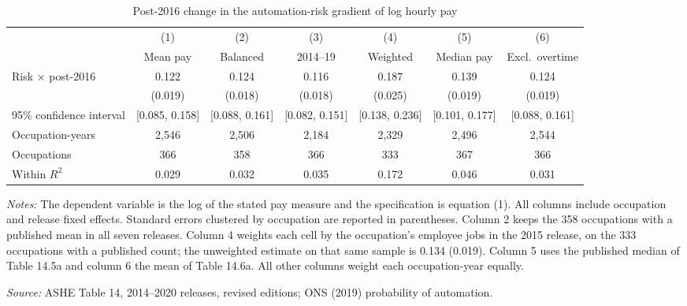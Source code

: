 \begin{table}[!ht]\centering
\caption{Post-2016 change in the automation-risk gradient of log hourly pay}\label{tab:pay}
\begin{threeparttable}\scriptsize\setlength{\tabcolsep}{2.5pt}
\begin{tabular}{lcccccc}\toprule
 & (1) & (2) & (3) & (4) & (5) & (6) \\
 & Mean pay & Balanced & 2014--19 & Weighted & Median pay & Excl.\ overtime \\ \midrule
Risk $\times$ post-2016 & 0.122 & 0.124 & 0.116 & 0.187 & 0.139 & 0.124 \\
 & (0.019) & (0.018) & (0.018) & (0.025) & (0.019) & (0.019) \\
95\% confidence interval & [0.085, 0.158] & [0.088, 0.161] & [0.082, 0.151] & [0.138, 0.236] & [0.101, 0.177] & [0.088, 0.161] \\ \addlinespace
Occupation-years & 2,546 & 2,506 & 2,184 & 2,329 & 2,496 & 2,544 \\
Occupations & 366 & 358 & 366 & 333 & 367 & 366 \\
Within $R^{2}$ & 0.029 & 0.032 & 0.035 & 0.172 & 0.046 & 0.031 \\
\bottomrule\end{tabular}
\begin{tablenotes}\footnotesize
\item \emph{Notes:} The dependent variable is the log of the stated pay measure and the specification is equation (1). All columns include occupation and release fixed effects. Standard errors clustered by occupation are reported in parentheses. Column 2 keeps the 358 occupations with a published mean in all seven releases. Column 4 weights each cell by the occupation's employee jobs in the 2015 release, on the 333 occupations with a published count; the unweighted estimate on that same sample is 0.134 (0.019). Column 5 uses the published median of Table 14.5a and column 6 the mean of Table 14.6a. All other columns weight each occupation-year equally.
\item \emph{Source:} ASHE Table 14, 2014--2020 releases, revised editions; ONS (2019) probability of automation.
\end{tablenotes}\end{threeparttable}\end{table}